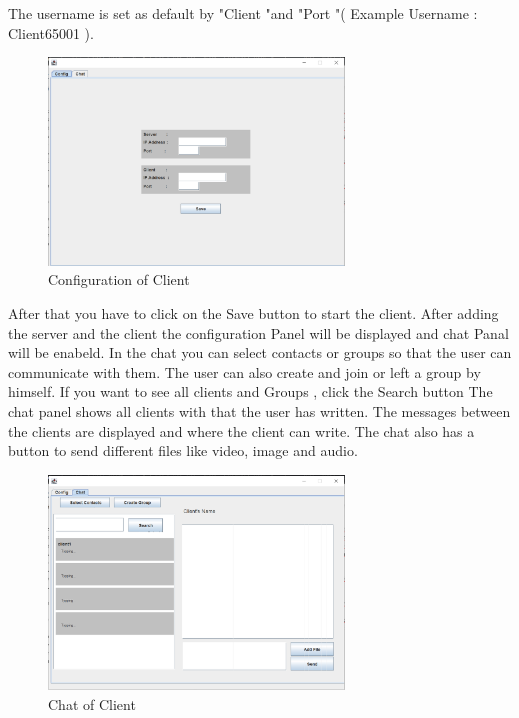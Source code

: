 \noindent
The username is set as default by "Client "and "Port "( Example Username : Client65001 ).
\begin{figure}
    \centering
    \includegraphics[width=0.7\textwidth]{gfx/Client_Config.png}
    \caption{Configuration of Client}
    \label{fig:Client-config}
\end{figure}
\noindent
After that you have to click on the Save button to start the client.
After adding the server and the client the configuration Panel will be displayed and chat Panal
will be enabeld. 
In the chat you can select contacts or groups so that the user can communicate with them.
The user can also create and join or left  a group by himself. 
If you want to see all clients and Groups , click the Search button 
The chat panel shows all clients with that the user has written. 
The messages between the clients are displayed and where the client can write. 
The chat also has a button to send different files like video, image and audio.
\begin{figure}
    \centering
    \includegraphics[width=0.7\textwidth]{gfx/Client_Chat.png}
    \caption{Chat of Client}
    \label{fig:Client-Chat}
\end{figure}